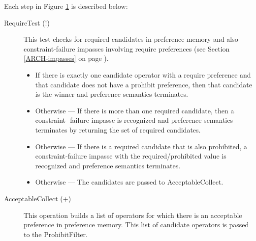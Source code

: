 
\begin{figure}
	\label{fig:prefsem}
\end{figure}

Each step in Figure \ref{fig:prefsem} is described below:

\begin{description}
	\item[RequireTest (!)]
	This test checks for required candidates in preference memory and
	also constraint-failure impasses involving require preferences (see
	Section \ref{ARCH-impasses} on page \pageref{ARCH-impasses}).
	
	\begin{itemize}
		\item If there is exactly one candidate operator with a require preference and
		that candidate does not have a prohibit preference, then that candidate
		is the winner and preference semantics terminates.
		\item Otherwise ---
		If there is more than one required candidate, then a constraint-
		failure impasse is recognized and preference semantics terminates 
		by returning the set of required candidates.
		\item Otherwise ---
		If there is a required candidate that is also prohibited, a
		constraint-failure impasse with the required/prohibited value is
		recognized and preference semantics terminates.
		\item Otherwise ---
		The candidates are passed to AcceptableCollect.
	\end{itemize}
	
	\item[AcceptableCollect (+) ] This operation builds a list of operators
	for which there is an acceptable preference in preference memory.
	This list of candidate operators is passed to the ProhibitFilter.\index{+}
	

\end{description}

